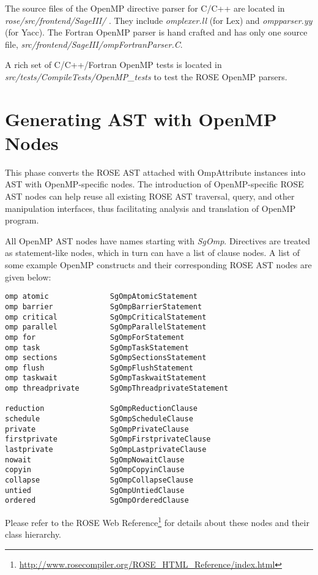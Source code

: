 The source files of the OpenMP directive parser for C/C++ are located in \textit{rose/src/frontend/SageIII/ }.
They include \textit{omplexer.ll} (for Lex) and \textit{ompparser.yy} (for Yacc).
The Fortran OpenMP parser is hand crafted and has only one source file, \textit{src/frontend/SageIII/ompFortranParser.C}. 

A rich set of C/C++/Fortran OpenMP tests is located in \textit{src/tests/CompileTests/OpenMP\_tests} to test the ROSE OpenMP parsers.
\section{Generating AST with OpenMP Nodes}
This phase converts the ROSE AST attached with OmpAttribute instances into AST with OpenMP-specific nodes.
The introduction of OpenMP-specific ROSE AST nodes can help reuse all existing ROSE AST traversal, query, and other manipulation interfaces, thus facilitating analysis and translation of OpenMP program.

All OpenMP AST nodes have names starting with \textit{SgOmp}. 
Directives are treated as statement-like nodes, which in turn can have a list of clause nodes.
A list of some example OpenMP constructs and their corresponding ROSE AST nodes are given below:

{\scriptsize
\begin{verbatim}
omp atomic              SgOmpAtomicStatement
omp barrier             SgOmpBarrierStatement
omp critical            SgOmpCriticalStatement
omp parallel            SgOmpParallelStatement
omp for                 SgOmpForStatement
omp task                SgOmpTaskStatement
omp sections            SgOmpSectionsStatement
omp flush               SgOmpFlushStatement
omp taskwait            SgOmpTaskwaitStatement
omp threadprivate       SgOmpThreadprivateStatement

reduction               SgOmpReductionClause
schedule                SgOmpScheduleClause
private                 SgOmpPrivateClause
firstprivate            SgOmpFirstprivateClause
lastprivate             SgOmpLastprivateClause
nowait                  SgOmpNowaitClause
copyin                  SgOmpCopyinClause
collapse                SgOmpCollapseClause
untied                  SgOmpUntiedClause
ordered                 SgOmpOrderedClause
\end{verbatim}
}
 
Please refer to the ROSE Web Reference\footnote{\url{http://www.rosecompiler.org/ROSE_HTML_Reference/index.html}} for details about these nodes and their class hierarchy. 
